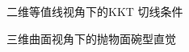 \begin{subfigure}[b]{0.48\textwidth}
  \centering
  \caption{二维等值线视角下的KKT 切线条件}
\end{subfigure}\hfill
\begin{subfigure}[b]{0.48\textwidth}
  \centering
  \caption{三维曲面视角下的抛物面碗型直觉}
\end{subfigure}

